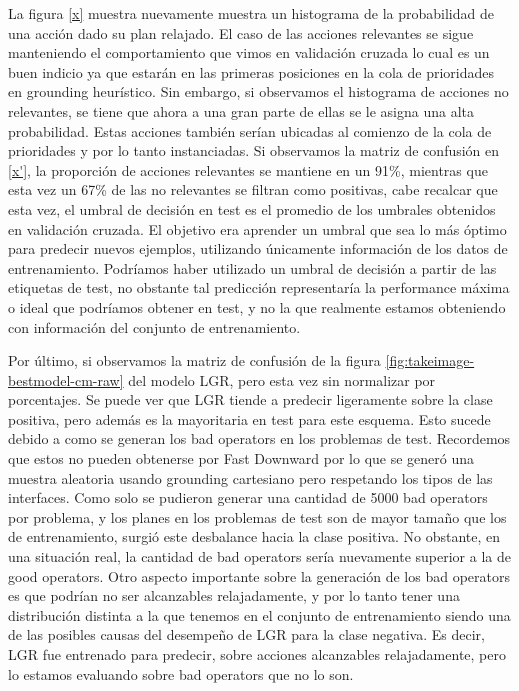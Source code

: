 La figura \ref{x} muestra nuevamente muestra un histograma de la probabilidad de
una acción dado su plan relajado. El caso de las acciones relevantes se sigue
manteniendo el comportamiento que vimos en validación cruzada lo cual es un buen
indicio ya que estarán en las primeras posiciones en la cola de prioridades en
grounding heurístico. Sin embargo, si observamos el histograma de acciones no
relevantes, se tiene que ahora a una gran parte de ellas se le asigna una alta
probabilidad. Estas acciones también serían ubicadas al comienzo de la cola de
prioridades y por lo tanto instanciadas. Si observamos la matriz de confusión en
\ref{x'}, la proporción de acciones relevantes se mantiene en un 91\%, mientras
que esta vez un 67\% de las no relevantes se filtran como positivas, cabe
recalcar que esta vez, el umbral de decisión en test es el promedio de los
umbrales obtenidos en validación cruzada. El objetivo era aprender un umbral que
sea lo más óptimo para predecir nuevos ejemplos, utilizando únicamente
información de los datos de entrenamiento. Podríamos haber utilizado un umbral
de decisión a partir de las etiquetas de test, no obstante tal predicción
representaría la performance máxima o ideal que podríamos obtener en test, y no
la que realmente estamos obteniendo con información del conjunto de
entrenamiento.

Por último, si observamos la matriz de confusión de la figura
\ref{fig:takeimage-bestmodel-cm-raw} del modelo LGR, pero esta vez sin
normalizar por porcentajes. Se puede ver que LGR tiende a predecir ligeramente
sobre la clase positiva, pero además es la mayoritaria en test para este
esquema. Esto sucede debido a como se generan los bad operators en los problemas
de test. Recordemos que estos no pueden obtenerse por Fast Downward por lo que
se generó una muestra aleatoria usando grounding cartesiano pero respetando los
tipos de las interfaces. Como solo se pudieron generar una cantidad de 5000 bad
operators por problema, y los planes en los problemas de test son de mayor
tamaño que los de entrenamiento, surgió este desbalance hacia la clase positiva.
No obstante, en una situación real, la cantidad de bad operators sería
nuevamente superior a la de good operators. Otro aspecto importante sobre la
generación de los bad operators es que podrían no ser alcanzables relajadamente,
y por lo tanto tener una distribución distinta a la que tenemos en el conjunto
de entrenamiento siendo una de las posibles causas del desempeño de LGR para la
clase negativa. Es decir, LGR fue entrenado para predecir, sobre acciones
alcanzables relajadamente, pero lo estamos evaluando sobre bad operators que no
lo son.

